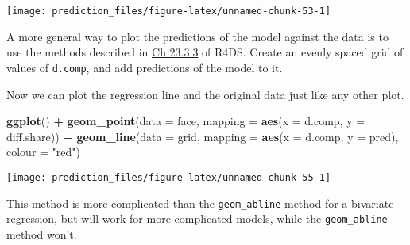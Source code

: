 \documentclass[]{book}
\newenvironment{Shaded}{\begin{snugshade}}{\end{snugshade}}
\newcommand{\KeywordTok}[1]{\textcolor[rgb]{0.13,0.29,0.53}{\textbf{#1}}}
\newcommand{\DataTypeTok}[1]{\textcolor[rgb]{0.13,0.29,0.53}{#1}}
\newcommand{\StringTok}[1]{\textcolor[rgb]{0.31,0.60,0.02}{#1}}
\newcommand{\CommentTok}[1]{\textcolor[rgb]{0.56,0.35,0.01}{\textit{#1}}}
\newcommand{\OperatorTok}[1]{\textcolor[rgb]{0.81,0.36,0.00}{\textbf{#1}}}
\newcommand{\NormalTok}[1]{#1}
\theoremstyle{definition}
\theoremstyle{definition}
\theoremstyle{definition}
\theoremstyle{remark}
\begin{document}
\begin{center}\texttt{[image: prediction\_files/figure-latex/unnamed-chunk-53-1]} \end{center}

A more general way to plot the predictions of the model against the data
is to use the methods described in
\href{http://r4ds.had.co.nz/model-basics.html\#visualising-models}{Ch
23.3.3} of R4DS. Create an evenly spaced grid of values of
\texttt{d.comp}, and add predictions of the model to it.

\begin{Shaded}
\end{Shaded}

Now we can plot the regression line and the original data just like any
other plot.

\begin{Shaded}
\begin{Highlighting}[]
\KeywordTok{ggplot}\NormalTok{() }\OperatorTok{+}
\StringTok{  }\KeywordTok{geom_point}\NormalTok{(}\DataTypeTok{data =}\NormalTok{ face, }\DataTypeTok{mapping =} \KeywordTok{aes}\NormalTok{(}\DataTypeTok{x =}\NormalTok{ d.comp, }\DataTypeTok{y =}\NormalTok{ diff.share)) }\OperatorTok{+}
\StringTok{  }\KeywordTok{geom_line}\NormalTok{(}\DataTypeTok{data =}\NormalTok{ grid, }\DataTypeTok{mapping =} \KeywordTok{aes}\NormalTok{(}\DataTypeTok{x =}\NormalTok{ d.comp, }\DataTypeTok{y =}\NormalTok{ pred),}
            \DataTypeTok{colour =} \StringTok{"red"}\NormalTok{)}
\end{Highlighting}
\end{Shaded}

\begin{center}\texttt{[image: prediction\_files/figure-latex/unnamed-chunk-55-1]} \end{center}

This method is more complicated than the \texttt{geom\_abline} method
for a bivariate regression, but will work for more complicated models,
while the \texttt{geom\_abline} method won't.
\end{document}
